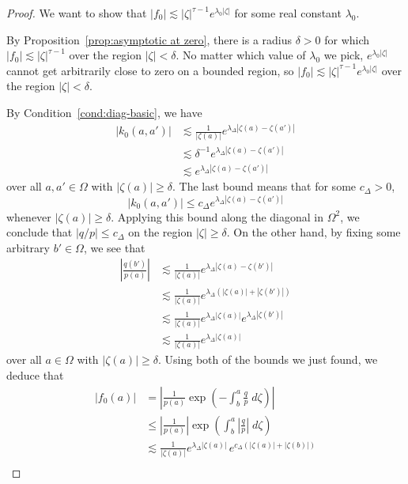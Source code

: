 \documentclass[final]{siamart220329}
\newcommand{\hardker}{k_0}
\newcommand{\solproto}{f_0}
\newcommand{\domain}{\Omega}
\begin{document}
\begin{proof}
We want to show that $|\solproto| \lesssim |\zeta|^{\tau-1} e^{\lambda_0|\zeta|}$ for some real constant $\lambda_0$.

By Proposition~\ref{prop:asymptotic at zero}, there is a radius $\delta > 0$ for which $|\solproto| \lesssim |\zeta|^{\tau-1}$ over the region $|\zeta| < \delta$. No matter which value of $\lambda_0$ we pick, $e^{\lambda_0|\zeta|}$ cannot get arbitrarily close to zero on a bounded region, so $|\solproto| \lesssim |\zeta|^{\tau-1} e^{\lambda_0|\zeta|}$ over the region $|\zeta| < \delta$.

By Condition~\eqref{cond:diag-basic}, we have
\begin{align*}
|\hardker(a, a')| & \lesssim \frac{1}{|\zeta(a)|} e^{\lambda_\Delta |\zeta(a) - \zeta(a')|} \\
& \lesssim \delta^{-1} e^{\lambda_\Delta |\zeta(a) - \zeta(a')|} \\
& \lesssim e^{\lambda_\Delta |\zeta(a) - \zeta(a')|}
\end{align*}
over all $a, a' \in \domain$ with $|\zeta(a)| \ge \delta$. The last bound means that for some $c_\Delta > 0$,
\[ |\hardker(a, a')| \le c_\Delta e^{\lambda_\Delta |\zeta(a) - \zeta(a')|} \]
whenever $|\zeta(a)| \ge \delta$. Applying this bound along the diagonal in $\domain^2$, we conclude that $|q/p| \le c_\Delta$ on the region $|\zeta| \ge \delta$. On the other hand, by fixing some arbitrary  $b' \in \domain$, we see that
\begin{align*}
\left|\frac{q(b')}{p(a)}\right| & \lesssim \frac{1}{|\zeta(a)|} e^{\lambda_\Delta|\zeta(a) - \zeta(b')|} \\
& \lesssim \frac{1}{|\zeta(a)|} e^{\lambda_\Delta(|\zeta(a)| + |\zeta(b')|)} \\
& \lesssim \frac{1}{|\zeta(a)|} e^{\lambda_\Delta|\zeta(a)|} e^{\lambda_\Delta|\zeta(b')|} \\
& \lesssim \frac{1}{|\zeta(a)|} e^{\lambda_\Delta|\zeta(a)|}
\end{align*}
over all $a \in \domain$ with $|\zeta(a)| \ge \delta$. Using both of the bounds we just found, we deduce that
\begin{align*}
|\solproto(a)| & = \left| \frac{1}{p(a)} \exp\left(-\int_{b}^{a}\frac{q}{p}\;d\zeta\right) \right| \\
& \le \left|\frac{1}{p(a)}\right| \exp\left(\int_{b}^{a}\left|\frac{q}{p}\right|\;d\zeta\right) \\
& \lesssim \frac{1}{|\zeta(a)|} e^{\lambda_\Delta|\zeta(a)|}\,e^{c_\Delta(|\zeta(a)| + |\zeta(b)|)} \\

\end{align*}
\end{proof}
\end{document}
